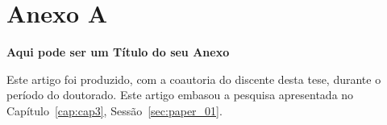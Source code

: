\chapter{Anexo A}
\label{an:a}
\begin{center}
    \textbf{Aqui pode ser um Título do seu Anexo}
\end{center}

Este artigo foi produzido, com a coautoria do discente desta tese, durante o período do doutorado. Este artigo embasou a pesquisa apresentada no Capítulo~\ref{cap:cap3}, Sessão~\ref{sec:paper_01}.


